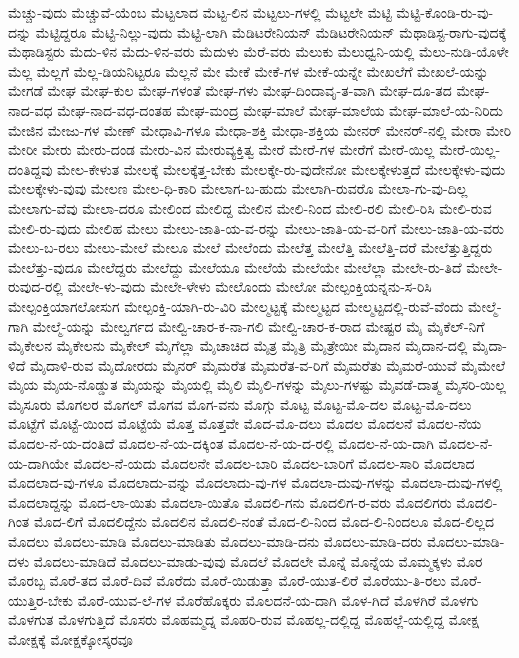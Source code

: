 {ಮೆಚ್ಚು-ವುದು
ಮೆಚ್ಚುವೆ-ಯೆಂಬ
ಮೆಟ್ಟಲಾದ
ಮೆಟ್ಟ-ಲಿನ
ಮೆಟ್ಟಲು-ಗಳಲ್ಲಿ
ಮೆಟ್ಟಲೇ
ಮೆಟ್ಟಿ
ಮೆಟ್ಟಿ-ಕೊಂಡಿ-ರು-ವು-ದನ್ನು
ಮೆಟ್ಟಿದ್ದರೂ
ಮೆಟ್ಟಿ-ನಿಲ್ಲು-ವುದು
ಮೆಟ್ಟಿ-ಲಾಗಿ
ಮೆಡಿಟರೇನಿಯನ್
ಮೆಡಿಟರೇನಿಯನ್
ಮೆಥಾಡಿಸ್ಟ-ರಾಗು-ವುದಕ್ಕೆ
ಮೆಥಾಡಿಸ್ಟರು
ಮೆದು-ಳಿನ
ಮೆದು-ಳಿನ-ವರು
ಮೆದುಳು
ಮೆರೆ-ವರು
ಮೆಲುಕು
ಮೆಲುಧ್ವನಿ-ಯಲ್ಲಿ
ಮೆಲು-ನುಡಿ-ಯೊಳೇ
ಮೆಲ್ಲ
ಮೆಲ್ಲಗೆ
ಮೆಲ್ಲ-ಡಿಯನಿಟ್ಟರೂ
ಮೆಲ್ಲನೆ
ಮೇ
ಮೇಕೆ
ಮೇಕೆ-ಗಳ
ಮೇಕೆ-ಯನ್ನೇ
ಮೇಖಲೆಗೆ
ಮೇಖಲೆ-ಯನ್ನು
ಮೇಗಡೆ
ಮೇಘ
ಮೇಘ-ಕುಲ
ಮೇಘ-ಗಳಂತೆ
ಮೇಘ-ಗಳು
ಮೇಘ-ದಿಂದಾವೃ-ತ-ವಾಗಿ
ಮೇಘ-ದೂ-ತದ
ಮೇಘ-ನಾದ-ವಧ
ಮೇಘ-ನಾದ-ವಧ-ದಂತಹ
ಮೇಘ-ಮಂದ್ರ
ಮೇಘ-ಮಾಲೆ
ಮೇಘ-ಮಾಲೆಯ
ಮೇಘ-ಮಾಲೆ-ಯ-ನಿರಿದು
ಮೇಜಿನ
ಮೇಜು-ಗಳ
ಮೇಣ್
ಮೇಧಾವಿ-ಗಳೂ
ಮೇಧಾ-ಶಕ್ತಿ
ಮೇಧಾ-ಶಕ್ತಿಯ
ಮೇನರ್
ಮೇನರ್-ನಲ್ಲಿ
ಮೇರಾ
ಮೇರಿ
ಮೇರೀ
ಮೇರು
ಮೇರು-ದಂಡ
ಮೇರು-ವಿನ
ಮೇರುವ್ಯಕ್ತಿತ್ವ
ಮೇರೆ
ಮೇರೆ-ಗಳ
ಮೇರೆಗೆ
ಮೇರೆ-ಯಿಲ್ಲ
ಮೇರೆ-ಯಿಲ್ಲ-ದಂತಿದ್ದವು
ಮೇಲ-ಕೇಳುತ
ಮೇಲಕ್ಕೆ
ಮೇಲಕ್ಕೆತ್ತ-ಬೇಕು
ಮೇಲಕ್ಕೇ-ರು-ವುದೇನೋ
ಮೇಲಕ್ಕೇಳುತ್ತದೆ
ಮೇಲಕ್ಕೇಳು-ವುದು
ಮೇಲಕ್ಕೇಳು-ವುವು
ಮೇಲಣ
ಮೇಲ-ಧಿ-ಕಾರಿ
ಮೇಲಾಗ-ಬ-ಹುದು
ಮೇಲಾಗಿ-ರುವರೊ
ಮೇಲಾ-ಗು-ವು-ದಿಲ್ಲ
ಮೇಲಾಗು-ವೆವು
ಮೇಲಾ-ದರೂ
ಮೇಲಿಂದ
ಮೇಲಿದ್ದ
ಮೇಲಿನ
ಮೇಲಿ-ನಿಂದ
ಮೇಲಿ-ರಲಿ
ಮೇಲಿ-ರಿಸಿ
ಮೇಲಿ-ರುವ
ಮೇಲಿ-ರು-ವುದು
ಮೇಲಿಹ
ಮೇಲು
ಮೇಲು-ಜಾತಿ-ಯ-ವ-ರನ್ನು
ಮೇಲು-ಜಾತಿ-ಯ-ವ-ರಿಗೆ
ಮೇಲು-ಜಾತಿ-ಯ-ವರು
ಮೇಲು-ಬ-ರಲು
ಮೇಲು-ಮೇಲೆ
ಮೇಲೂ
ಮೇಲೆ
ಮೇಲೆಂದು
ಮೇಲೆತ್ತ
ಮೇಲೆತ್ತಿ
ಮೇಲೆತ್ತಿ-ದರೆ
ಮೇಲೆತ್ತುತ್ತಿದ್ದರು
ಮೇಲೆತ್ತು-ವುದೂ
ಮೇಲೆದ್ದರು
ಮೇಲೆದ್ದು
ಮೇಲೆಯೂ
ಮೇಲೆಯೆ
ಮೇಲೆಯೇ
ಮೇಲೆಲ್ಲಾ
ಮೇಲೇ-ರು-ತಿದೆ
ಮೇಲೇ-ರುವುದ-ರಲ್ಲಿ
ಮೇಲೇ-ಳು-ವುದು
ಮೇಲೇ-ಳೇಳು
ಮೇಲೊಂದು
ಮೇಲೋ
ಮೇಲ್ಪಂಕ್ತಿಯನ್ನನು-ಸ-ರಿಸಿ
ಮೇಲ್ಪಂಕ್ತಿಯಾಗಲೋಸುಗ
ಮೇಲ್ಪಂಕ್ತಿ-ಯಾಗಿ-ರು-ವಿರಿ
ಮೇಲ್ಮಟ್ಟಕ್ಕೆ
ಮೇಲ್ಮಟ್ಟದ
ಮೇಲ್ಮಟ್ಟದಲ್ಲಿ-ರುವೆ-ವೆಂದು
ಮೇಲ್ಮೆ-ಗಾಗಿ
ಮೇಲ್ಮೆ-ಯನ್ನು
ಮೇಲ್ವರ್ಗದ
ಮೇಲ್ವಿ-ಚಾರ-ಕ-ನಾ-ಗಲಿ
ಮೇಲ್ವಿ-ಚಾರ-ಕ-ರಾದ
ಮೇಷ್ಟರ
ಮೈ
ಮೈಕೆಲ್-ನಿಗೆ
ಮೈಕೇಲನ
ಮೈಕೇಲನು
ಮೈಕೇಲ್
ಮೈಗೆಲ್ಲಾ
ಮೈಚಾಚಿದ
ಮೈತ್ರ
ಮೈತ್ರಿ
ಮೈತ್ರೇಯೀ
ಮೈದಾನ
ಮೈದಾನ-ದಲ್ಲಿ
ಮೈದಾ-ಳಿದೆ
ಮೈದಾಳಿ-ರುವ
ಮೈದೋರದು
ಮೈನರ್
ಮೈಮರೆತ
ಮೈಮರೆತ-ವ-ರಿಗೆ
ಮೈಮರೆತು
ಮೈಮರೆ-ಯುವೆ
ಮೈಮೇಲೆ
ಮೈಯ
ಮೈಯ-ನೊಡ್ಡುತ
ಮೈಯನ್ನು
ಮೈಯಲ್ಲಿ
ಮೈಲಿ
ಮೈಲಿ-ಗಳನ್ನು
ಮೈಲು-ಗಳಷ್ಟು
ಮೈವಡೆ-ದಾತ್ಮ
ಮೈಸರಿ-ಯಿಲ್ಲ
ಮೈಸೂರು
ಮೊಗಲರ
ಮೊಗಲ್
ಮೊಗವ
ಮೊಗ-ವನು
ಮೊಗ್ಗು
ಮೊಟ್ಟ
ಮೊಟ್ಟ-ಮೊ-ದಲ
ಮೊಟ್ಟ-ಮೊ-ದಲು
ಮೊಟ್ಟೆಗೆ
ಮೊಟ್ಟೆ-ಯಿಂದ
ಮೊಟ್ಟೆಯೆ
ಮೊತ್ತ
ಮೊತ್ತವೇ
ಮೊದ-ಮೊ-ದಲು
ಮೊದಲ
ಮೊದಲನೆ
ಮೊದಲ-ನೆಯ
ಮೊದಲ-ನೆ-ಯ-ದಂತಿದೆ
ಮೊದಲ-ನೆ-ಯ-ದಕ್ಕಿಂತ
ಮೊದಲ-ನೆ-ಯ-ದ-ರಲ್ಲಿ
ಮೊದಲ-ನೆ-ಯ-ದಾಗಿ
ಮೊದಲ-ನೆ-ಯ-ದಾಗಿಯೇ
ಮೊದಲ-ನೆ-ಯದು
ಮೊದಲನೇ
ಮೊದಲ-ಬಾರಿ
ಮೊದಲ-ಬಾರಿಗೆ
ಮೊದಲ-ಸಾರಿ
ಮೊದಲಾದ
ಮೊದಲಾದ-ವು-ಗಳೂ
ಮೊದಲಾದು-ವನ್ನು
ಮೊದಲಾದು-ವು-ಗಳ
ಮೊದಲಾ-ದುವು-ಗಳನ್ನು
ಮೊದಲಾ-ದುವು-ಗಳಲ್ಲಿ
ಮೊದಲಾದ್ದನ್ನು
ಮೊದ-ಲಾ-ಯಿತು
ಮೊದಲಾ-ಯಿತೊ
ಮೊದಲಿ-ಗನು
ಮೊದಲಿಗ-ರ-ವರು
ಮೊದಲಿಗರು
ಮೊದಲಿ-ಗಿಂತ
ಮೊದ-ಲಿಗೆ
ಮೊದಲಿದ್ದೆನು
ಮೊದಲಿನ
ಮೊದಲಿ-ನಂತೆ
ಮೊದ-ಲಿ-ನಿಂದ
ಮೊದ-ಲಿ-ನಿಂದಲೂ
ಮೊದ-ಲಿಲ್ಲದ
ಮೊದಲು
ಮೊದಲು-ಮಾಡಿ
ಮೊದಲು-ಮಾಡಿತು
ಮೊದಲು-ಮಾಡಿ-ದನು
ಮೊದಲು-ಮಾಡಿ-ದರು
ಮೊದಲು-ಮಾಡಿ-ದಳು
ಮೊದಲು-ಮಾಡಿದೆ
ಮೊದಲು-ಮಾಡು-ವುವು
ಮೊದಲೆ
ಮೊದಲೇ
ಮೊನ್ನೆ
ಮೊನ್ನೆಯ
ಮೊಮ್ಮಕ್ಕಳು
ಮೊರ
ಮೊರಬ್ಬ
ಮೊರೆ-ತದ
ಮೊರೆ-ದಿವೆ
ಮೊರೆದು
ಮೊರೆ-ಯಿಡುತ್ತಾ
ಮೊರೆ-ಯುತ-ಲಿರೆ
ಮೊರೆಯು-ತಿ-ರಲು
ಮೊರೆ-ಯುತ್ತಿರ-ಬೇಕು
ಮೊರೆ-ಯುವ-ಲೆ-ಗಳ
ಮೊರೆಹೊಕ್ಕರು
ಮೊಲದನೆ-ಯ-ದಾಗಿ
ಮೊಳ-ಗಿದೆ
ಮೊಳಗಿರೆ
ಮೊಳಗು
ಮೊಳಗುತ
ಮೊಳಗುತ್ತಿದೆ
ಮೊಸರು
ಮೊಹಮ್ಮದ್ನ
ಮೊಹರಿ-ರುವ
ಮೊಹಲ್ಲ-ದಲ್ಲಿದ್ದ
ಮೊಹಲ್ಲೆ-ಯಲ್ಲಿದ್ದ
ಮೋಕ್ಷ
ಮೋಕ್ಷಕ್ಕೆ
ಮೋಕ್ಷಕ್ಕೋಸ್ಕರವೂ
}
